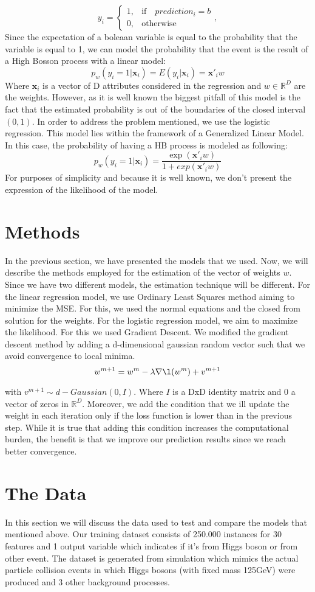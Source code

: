 \documentclass[10pt,conference,compsocconf]{IEEEtran}
\newcommand{\R}{\mathbb{R}}
\begin{document}
 $$
y_{i}=
\begin{cases}
1, & \text{if} \quad prediction_i=b\\
0, & \text{otherwise}
\end{cases}
, 
$$
Since the expectation of a boleaan variable is equal to the probability that the variable is equal to 1, we can model the probability that the event is the result of a High Bosson process with a linear model:
$$p_w(y_i=1|\textbf{x}_i)=E(y_i|\textbf{x}_i)=\textbf{x}'_i w$$
Where $\textbf{x}_i $ is a vector of D attributes considered in the regression and $w \in \R^D $ are the weights.
However, as it is well known the biggest pitfall of this model is the fact that the estimated probability is out of the boundaries of the closed interval $ ( 0,1 ) $. 
In order to address the problem mentioned, we use the logistic regression. This model lies within the framework of a Generalized Linear Model.  In this case, the probability of having a HB process is modeled as following:
$$p_w(y_i=1|\textbf{x}_i)=\frac{\exp(\textbf{x}'_i w)}{1+exp(\textbf{x}'_i w)}$$
For purposes of simplicity and because it is well known, we don't present the expression of the likelihood of the model.
\section{Methods}
In the previous section, we have presented the models that we used. Now, we will describe the methods employed for the estimation of the vector of weights $w$. Since we have two different models, the estimation technique will be different. 
For the linear regression model, we use Ordinary Least Squares method aiming to minimize the MSE. For this, we used the normal equations and the closed from solution for the weights. 
For the logistic regression model, we aim to maximize the likelihood. For this we used Gradient Descent. We modified the gradient descent method by adding a d-dimensional gaussian random vector such that we avoid convergence to local minima. 
$$w^{m+1}=w^{m}-\lambda  \nabla \l(w^m) +v^{m+1}$$

with $v^{m+1} \sim d-Gaussian(0,I)$. Where $I$ is a DxD identity matrix and 0 a vector of zeros in $\R^D$.
Moreover, we add the condition that we ill update the weight in each iteration only if the loss function is lower than in the previous step. While it is true that adding this condition increases the computational burden, the benefit is that we improve our prediction results since we reach better convergence.
\section{The Data}
\label{S1}
In this section we will discuss the data used to test and compare the models that mentioned above. Our training dataset consists of 250.000 instances for 30 features and 1 output variable which indicates if it's from Higgs boson or from other event. The dataset is generated from simulation which mimics the actual particle collision events in which Higgs bosons (with fixed mass 125GeV) were produced and 3 other background processes. 
\end{document}
